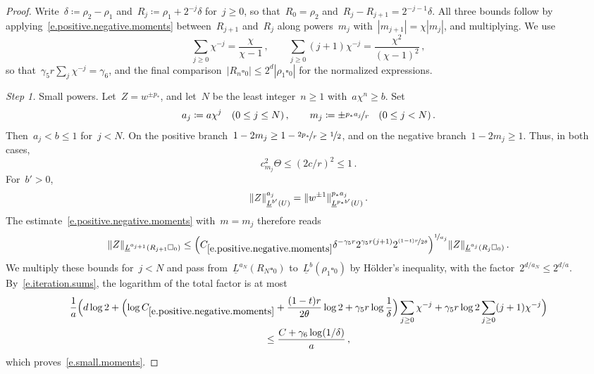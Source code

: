 \documentclass[11pt,letterpaper]{article}
\numberwithin{equation}{section}
\theoremstyle{definition}
\newcommand{\nf}{\nicefrac}
\newcommand{\cu}{\square}
\DeclarePairedDelimiter{\norm}{\lVert}{\rVert}
\begin{document}
\begin{proof}
Write~$\delta\coloneqq\rho_2-\rho_1$ and~$R_j\coloneqq\rho_1+2^{-j}\delta$ for~$j\geq0$, so that~$R_0=\rho_2$ and~$R_j-R_{j+1}=2^{-j-1}\delta$. All three bounds follow by applying~\eqref{e.positive.negative.moments} between~$R_{j+1}$ and~$R_j$ along powers~$m_j$ with~$|m_{j+1}|=\chi|m_j|$, and multiplying. We use
\begin{equation}
	\sum_{j\geq0}\chi^{-j}=\frac\chi{\chi-1}\,,\qquad \sum_{j\geq0}(j+1)\chi^{-j}=\frac{\chi^2}{(\chi-1)^2}\,,
	\label{e.iteration.sums}
\end{equation}
so that~$\gamma_5r\sum_j\chi^{-j}=\gamma_6$, and the final comparison~$|R_n\cu_0|\leq2^d|\rho_1\cu_0|$ for the normalized expressions.

\smallskip

\emph{Step 1.} Small powers. Let~$Z=w^{\pm p_*}$, and let~$N$ be the least integer~$n\geq1$ with~$a\chi^n\geq b$. Set
\begin{equation*}
	a_j\coloneqq a\chi^j\quad(0\leq j\leq N)\,,\qquad m_j\coloneqq\pm\nf{p_*a_j}r\quad(0\leq j<N)\,.
\end{equation*}
Then~$a_j<b\leq1$ for~$j<N$. On the positive branch~$1-2m_j\geq1-\nf{2p_*}r\geq\nf12$, and on the negative branch~$1-2m_j\geq1$. Thus, in both cases,
\begin{equation*}
	c_{m_j}^2\Theta\leq(2c/r)^2\leq1\,.
\end{equation*}
For~$b'>0$,
\begin{equation*}
	\norm{Z}_{\underline L^{b'}(U)}^{a_j}=\norm{w^{\pm1}}_{\underline L^{p_*b'}(U)}^{p_*a_j}\,.
\end{equation*}
The estimate~\eqref{e.positive.negative.moments} with~$m=m_j$ therefore reads
\begin{equation*}
	\norm{Z}_{\underline L^{a_{j+1}}(R_{j+1}\cu_0)}\leq\Bigl(C_{\eqref{e.positive.negative.moments}}\delta^{-\gamma_5r}2^{\gamma_5r(j+1)}2^{\nf{(1-t)r}{2\theta}}\Bigr)^{\nf1{a_j}}\norm{Z}_{\underline L^{a_j}(R_j\cu_0)}\,.
\end{equation*}
We multiply these bounds for~$j<N$ and pass from~$\underline L^{a_N}(R_N\cu_0)$ to~$\underline L^b(\rho_1\cu_0)$ by H\"older's inequality, with the factor~$2^{d/a_N}\leq2^{d/a}$. By~\eqref{e.iteration.sums}, the logarithm of the total factor is at most
\begin{multline*}
	\frac1a\Bigl(d\log2+\Bigl(\log C_{\eqref{e.positive.negative.moments}}+\frac{(1-t)r}{2\theta}\log2+\gamma_5r\log\frac1\delta\Bigr)\sum_{j\geq0}\chi^{-j}+\gamma_5r\log2\sum_{j\geq0}(j+1)\chi^{-j}\Bigr)\\
	\leq\frac{C+\gamma_6\log(1/\delta)}a\,,
\end{multline*}
which proves~\eqref{e.small.moments}.


\end{proof}
\end{document}
